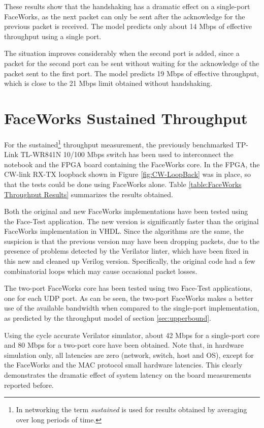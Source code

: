 \documentclass[defaultstyle,10pt,master,Helvetica]{thesis}
\begin{document}
These results show that the handshaking has a dramatic effect on a single-port FaceWorks, as the next packet can only be sent after the acknowledge for the previous packet is received. The model predicts only about 14 Mbps of effective throughput using a single port.

The situation improves considerably when the second port is added, since a packet for the second port
can be sent without waiting for the acknowledge of the packet sent to the first port. The model
predicts 19 Mbps of effective throughput, which is close to the 21 Mbps limit obtained without handshaking.


\section{FaceWorks Sustained Throughput}

For the sustained\footnote{In networking the term {\it sustained} is used for results obtained by averaging over long periods of time.} throughput measurement, the previously benchmarked TP-Link TL-WR841N 10/100 Mbps switch has been used to interconnect the notebook and the FPGA board containing the FaceWorks core. In the FPGA, the CW-link RX-TX loopback shown in Figure \ref{fig:CW-LoopBack} was in place, so that the tests could be done using FaceWorks alone. Table \ref{table:FaceWorks Throughput Results} summarizes the results obtained.



Both the original and new FaceWorks implementations have been tested using the Face-Test application. 
The new version is significantly faster than the original FaceWorks implementation in VHDL. Since the algorithms are the same, the suspicion is that the previous version may have been dropping packets, due to the presence of problems detected by the Verilator linter, which have been fixed in this new and cleaned up Verilog version. Specifically, the original code had a few combinatorial loops which may cause occasional packet losses.

The two-port FaceWorks core has been tested using two Face-Test applications, one for each UDP port. As can be seen, the two-port FaceWorks makes a better use of the available bandwidth when compared to the single-port implementation, as predicted by the throughput model of section \ref{sec:upperbound}.

Using the cycle accurate Verilator simulator, about 42 Mbps for a single-port core and 80 Mbps for a two-port core have been obtained.  Note that, in hardware simulation only, all latencies are zero (network, switch, host and \ac{OS}), except for the FaceWorks and the MAC protocol small hardware latencies. This clearly demonstrates the dramatic effect of system latency on the board measurements reported before.
\end{document}
